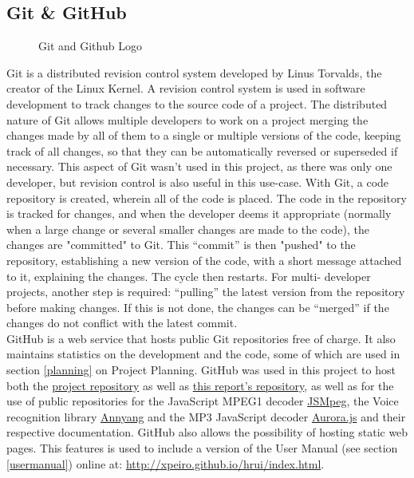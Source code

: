 \subsection{Git \& GitHub} \label{git}
\begin{figure}[H]
\centering
{}
\caption{Git and Github Logo}
\end{figure}
Git is a distributed revision control system developed by Linus Torvalds, the creator of the Linux Kernel. A revision control system is
used in software development to track changes to the source code of a project. The distributed nature of Git allows multiple developers
to work on a project merging the changes made by all of them to a single or multiple versions of the code, keeping track of all changes,
so that they can be automatically reversed or superseded if necessary. This aspect of Git wasn't used in this project, as there was only
one developer, but revision control is also useful in this use-case. With Git, a code repository is created, wherein all of the code is
placed. The code in the repository is tracked for changes, and when the developer deems it appropriate (normally when a large change or
several smaller changes are made to the code), the changes are "committed" to Git. This ``commit'' is then "pushed" to the repository,
establishing a new version of the code, with a short message attached to it, explaining the changes. The cycle then restarts. For multi-
developer projects, another step is required: ``pulling'' the latest version from the repository  before making changes. If this is not
done, the changes can be ``merged'' if the changes do not conflict with the latest commit.\\

GitHub is a web service that hosts public Git repositories free of charge. It also maintains statistics on the development and the code,
 some of which are used in section \ref{planning} on Project Planning. GitHub was used in this project to host both the 
\href{https://github.com/xpeiro/HTML5RUI}{project repository} as well as \href{https://github.com/xpeiro/PFC}{this report's repository}, 
as well as for the use of public repositories for the JavaScript MPEG1 decoder \href{https://github.com/phoboslab/jsmpeg}{JSMpeg}, the 
Voice recognition library \href{https://github.com/TalAter/annyang}{Annyang} and the MP3 JavaScript decoder 
\href{https://github.com/audiocogs/aurora.js/}{Aurora.js} and their respective documentation. GitHub also allows the possibility of
hosting static web pages. This features is used to include a version of the User Manual (see section \ref{usermanual}) online at: 
\url{http://xpeiro.github.io/hrui/index.html}.\\

